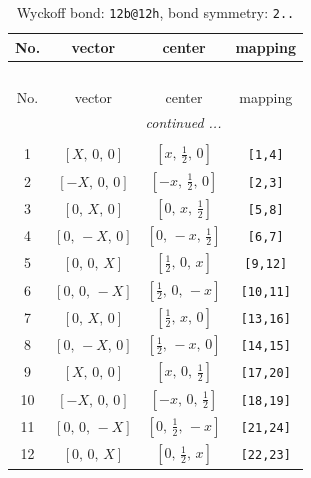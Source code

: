 \documentclass[fleqn,8pt]{jsarticle}
\begin{document}
\renewcommand{\arraystretch}{1.2}
\begin{longtable}{cccc}
\caption{Wyckoff bond: {\tt 12b@12h}, bond symmetry: {\tt 2..}}
 \\
 \hline \hline
No. & vector & center & mapping \\ \hline \endfirsthead

\multicolumn{3}{l}{\tablename\ \thetable{}} \\
 \hline \hline
No. & vector & center & mapping \\ \hline \endhead

 \hline \hline
\multicolumn{3}{r}{\footnotesize\it continued ...} \\ \endfoot

 \hline \hline
\multicolumn{3}{r}{} \\ \endlastfoot

1 & $\left[ X,\, 0,\, 0 \right]$ & $\left[ x,\, \frac{1}{2},\, 0 \right]$ & {\tt [1,4]} \\ \hline
2 & $\left[ - X,\, 0,\, 0 \right]$ & $\left[ - x,\, \frac{1}{2},\, 0 \right]$ & {\tt [2,3]} \\ \hline
3 & $\left[ 0,\, X,\, 0 \right]$ & $\left[ 0,\, x,\, \frac{1}{2} \right]$ & {\tt [5,8]} \\ \hline
4 & $\left[ 0,\, - X,\, 0 \right]$ & $\left[ 0,\, - x,\, \frac{1}{2} \right]$ & {\tt [6,7]} \\ \hline
5 & $\left[ 0,\, 0,\, X \right]$ & $\left[ \frac{1}{2},\, 0,\, x \right]$ & {\tt [9,12]} \\ \hline
6 & $\left[ 0,\, 0,\, - X \right]$ & $\left[ \frac{1}{2},\, 0,\, - x \right]$ & {\tt [10,11]} \\ \hline
7 & $\left[ 0,\, X,\, 0 \right]$ & $\left[ \frac{1}{2},\, x,\, 0 \right]$ & {\tt [13,16]} \\ \hline
8 & $\left[ 0,\, - X,\, 0 \right]$ & $\left[ \frac{1}{2},\, - x,\, 0 \right]$ & {\tt [14,15]} \\ \hline
9 & $\left[ X,\, 0,\, 0 \right]$ & $\left[ x,\, 0,\, \frac{1}{2} \right]$ & {\tt [17,20]} \\ \hline
10 & $\left[ - X,\, 0,\, 0 \right]$ & $\left[ - x,\, 0,\, \frac{1}{2} \right]$ & {\tt [18,19]} \\ \hline
11 & $\left[ 0,\, 0,\, - X \right]$ & $\left[ 0,\, \frac{1}{2},\, - x \right]$ & {\tt [21,24]} \\ \hline
12 & $\left[ 0,\, 0,\, X \right]$ & $\left[ 0,\, \frac{1}{2},\, x \right]$ & {\tt [22,23]} \\
\end{longtable}
\end{document}
